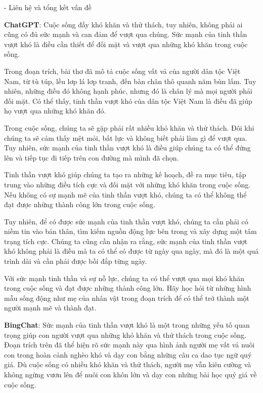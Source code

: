 \documentclass{article}
\begin{document}
{\begin{mdframed}[linewidth=1pt,linecolor=red]
		- Liên hệ và tổng kết vấn đề
		
		\textbf{ChatGPT}:
		Cuộc sống đầy khó khăn và thử thách, tuy nhiên, không phải ai cũng có đủ sức mạnh và can đảm để vượt qua chúng. Sức mạnh của tinh thần vượt khó là điều cần thiết để đối mặt và vượt qua những khó khăn trong cuộc sống.
		
		Trong đoạn trích, bài thơ đã mô tả cuộc sống vất vả của người dân tộc Việt Nam, từ tù túp, lều lơp lá lơp tranh, đến bàn chân thô quanh năm bùn lấm. Tuy nhiên, những điều đó không hạnh phúc, nhưng đó là chân lý mà mọi người phải đối mặt. Có thể thấy, tinh thần vượt khó của dân tộc Việt Nam là điều đã giúp họ vượt qua những khó khăn đó.
		
		Trong cuộc sống, chúng ta sẽ gặp phải rất nhiều khó khăn và thử thách. Đôi khi chúng ta sẽ cảm thấy mệt mỏi, bất lực và không biết phải làm gì để vượt qua. Tuy nhiên, sức mạnh của tinh thần vượt khó là điều giúp chúng ta có thể đứng lên và tiếp tục đi tiếp trên con đường mà mình đã chọn.
		
		Tinh thần vượt khó giúp chúng ta tạo ra những kế hoạch, đề ra mục tiêu, tập trung vào những điều tích cực và đối mặt với những khó khăn trong cuộc sống. Nếu không có sự mạnh mẽ của tinh thần vượt khó, chúng ta có thể không thể đạt được những thành công lớn trong cuộc sống.
		
		Tuy nhiên, để có được sức mạnh của tinh thần vượt khó, chúng ta cần phải có niềm tin vào bản thân, tìm kiếm nguồn động lực bên trong và xây dựng một tâm trạng tích cực. Chúng ta cũng cần nhận ra rằng, sức mạnh của tinh thần vượt khó không phải là điều mà ta có thể có được từ ngày qua ngày, mà đó là một quá trình dài và cần phải được bồi đắp từng ngày.
		
		Với sức mạnh tinh thần và sự nỗ lực, chúng ta có thể vượt qua mọi khó khăn trong cuộc sống và đạt được những thành công lớn. Hãy học hỏi từ những hình mẫu sống động như mẹ của nhân vật trong đoạn trích để có thể trở thành một người mạnh mẽ và thành đạt.
		
		\textbf{BingChat}: 
		Sức mạnh của tinh thần vượt khó là một trong những yếu tố quan trọng giúp con người vượt qua những khó khăn và thử thách trong cuộc sống. Đoạn trích trên đã thể hiện rõ sức mạnh này qua hình ảnh người mẹ vất vả nuôi con trong hoàn cảnh nghèo khó và dạy con bằng những câu ca dao tục ngữ quý giá. Dù cuộc sống có nhiều khó khăn và thử thách, người mẹ vẫn kiên cường và không ngừng vươn lên để nuôi con khôn lớn và dạy con những bài học quý giá về cuộc sống.
		

\end{mdframed}}
\end{document}

